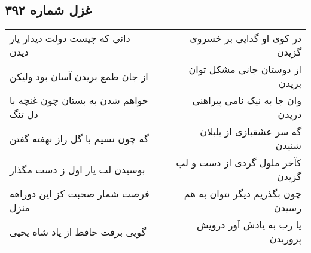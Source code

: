 \begin{center}
\section*{غزل شماره ۳۹۲}
\label{sec:sh392}
\begin{longtable}{l p{0.5cm} r}
دانی که چیست دولت دیدار یار دیدن
&&
در کوی او گدایی بر خسروی گزیدن
\\
از جان طمع بریدن آسان بود ولیکن
&&
از دوستان جانی مشکل توان بریدن
\\
خواهم شدن به بستان چون غنچه با دل تنگ
&&
وان جا به نیک نامی پیراهنی دریدن
\\
گه چون نسیم با گل راز نهفته گفتن
&&
گه سر عشقبازی از بلبلان شنیدن
\\
بوسیدن لب یار اول ز دست مگذار
&&
کآخر ملول گردی از دست و لب گزیدن
\\
فرصت شمار صحبت کز این دوراهه منزل
&&
چون بگذریم دیگر نتوان به هم رسیدن
\\
گویی برفت حافظ از یاد شاه یحیی
&&
یا رب به یادش آور درویش پروریدن
\\
\end{longtable}
\end{center}

